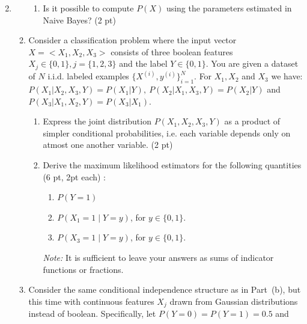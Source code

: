\documentclass{article}
\theoremstyle{definition}
\theoremstyle{remark}
\newenvironment{Q}
        {%
          \clearpage
          \item
        }
        {%
          \phantom{s} %
          \bigskip
        }
\begin{document}
\begin{enumerate}[font={\Large\bfseries},left=0pt]
\begin{Q}
\begin{enumerate}
\begin{enumerate}
				      \item Is it possible to compute $P(X)$ using the parameters estimated in Naive Bayes? (2 pt)

			      \end{enumerate}
			\item
			      Consider a classification problem where the input vector \( X = < X_1, X_2, X_3> \) consists of three boolean features \( X_j \in \{0,1\}, j = \{1,2,3\} \) and the label \( Y \in \{0,1\} \). You are given a dataset of \( N \) i.i.d. labeled examples \( \{X^{(i)},y^{(i)}\}_{i=1}^{N} \). For $X_1, X_2$ and $X_3$ we have:
			      $P(X_1 \vert X_2, X_3,Y) = P(X_1 | Y), ~P(X_2 \vert X_1, X_3, Y) = P(X_2 \vert Y)$ and $P(X_3 \vert X_1, X_2, Y) = P(X_3 \vert X_1)$.

			      \begin{enumerate}
				      \item
				            Express the joint distribution \( P(X_1, X_2, X_3, Y) \) as a product of simpler conditional probabilities, i.e. each variable depends only on atmost one another variable. (2 pt)

				      \item
				            Derive the maximum likelihood estimators for the following quantities (6 pt, 2pt each) :
				            \begin{enumerate}
					            \item \(  P(Y = 1) \)
					            \item \( P(X_1 = 1 \mid Y = y) \), for \( y \in \{0,1\} \).
					            \item \(  P(X_3 = 1 \mid Y = y) \), for $y \in \{0,1\}.$
				            \end{enumerate}

				            \textit{Note:}  It is sufficient to leave your answers as sums of indicator functions or fractions.

			      \end{enumerate}
			\item
			      Consider the same conditional independence structure as in Part~(b), but this time with continuous features $X_j$ drawn from Gaussian distributions instead of boolean. Specifically, let \(P(Y=0)=P(Y=1)=0.5\) and


\end{enumerate}
\end{Q}
\end{enumerate}
\end{document}
